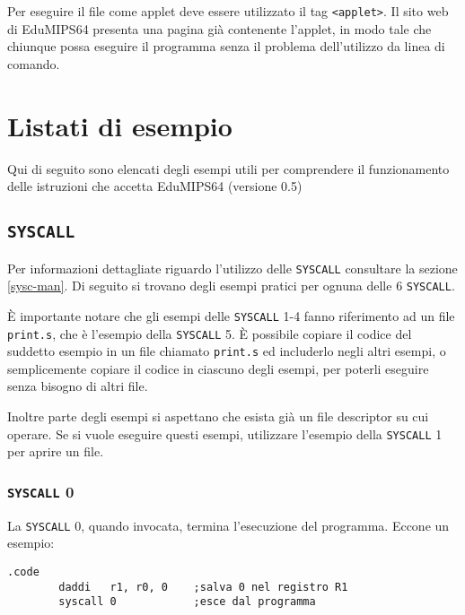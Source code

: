 \documentclass[12pt]{report}
\newcommand{\EM}{EduMIPS64}
\newcommand{\EV}{0.5}
\newcommand{\SC}{\texttt{SYSCALL}}
\begin{document}
Per eseguire il file come applet deve essere utilizzato il tag \texttt{<applet>}. Il sito web di \EM{}
presenta una pagina gi\`{a} contenente l'applet, in modo tale che chiunque possa eseguire il programma senza il problema dell'utilizzo da linea di comando.

\printindex

\chapter{Listati di esempio}
Qui di seguito sono elencati degli esempi utili per comprendere il funzionamento
delle istruzioni che accetta \EM{} (versione \EV)

\section{\SC{}}
Per informazioni dettagliate riguardo l'utilizzo delle \SC{} consultare la
sezione \ref{sysc-man}. Di seguito si trovano degli esempi pratici per ognuna
delle 6 \SC{}.

\`E importante notare che gli esempi delle \SC{} 1-4 fanno riferimento ad un
file \texttt{print.s}, che \`e l'esempio della \SC{} 5. \`E possibile copiare il
codice del suddetto esempio in un file chiamato \texttt{print.s} ed includerlo
negli altri esempi, o semplicemente copiare il codice in ciascuno degli esempi,
per poterli eseguire senza bisogno di altri file.

Inoltre parte degli esempi si aspettano che esista gi\`a un file descriptor su
cui operare. Se si vuole eseguire questi esempi, utilizzare l'esempio della
\SC{} 1 per aprire un file.

\subsection{\SC{} 0}
La \SC{} 0, quando invocata, termina l'esecuzione del programma.
Eccone un esempio:
\begin{lstlisting}[caption={Esempio \SC{} 0}, label={code:syscall0}, style={mips}]
        .code
        daddi   r1, r0, 0    ;salva 0 nel registro R1
        syscall 0            ;esce dal programma
\end{lstlisting}
\end{document}
